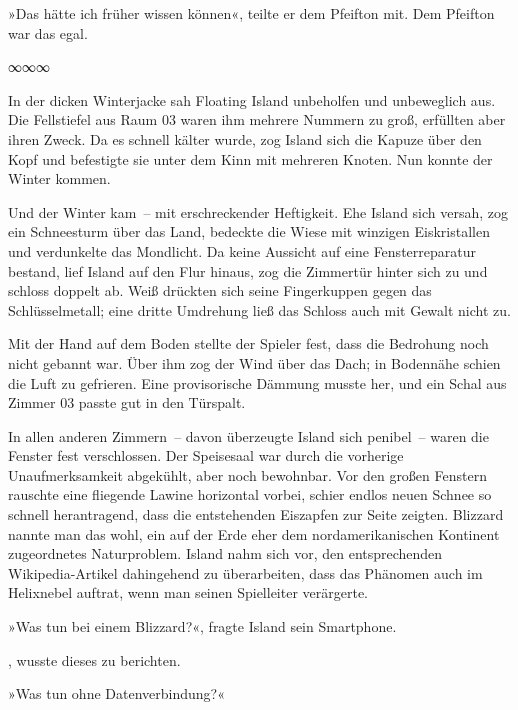 
»Das hätte ich früher wissen können«, teilte er dem Pfeifton mit. Dem Pfeifton war das egal.

\begin{center}
∞∞∞
\end{center}

In der dicken Winterjacke sah Floating Island unbeholfen und unbeweglich aus. Die Fellstiefel aus Raum 03 waren ihm mehrere Nummern zu groß, erfüllten aber ihren Zweck. Da es schnell kälter wurde, zog Island sich die Kapuze über den Kopf und befestigte sie unter dem Kinn mit mehreren Knoten. Nun konnte der Winter kommen.

Und der Winter kam~– mit erschreckender Heftigkeit. Ehe Island sich versah, zog ein Schneesturm über das Land, bedeckte die Wiese mit winzigen Eiskristallen und verdunkelte das Mondlicht. Da keine Aussicht auf eine Fensterreparatur bestand, lief Island auf den Flur hinaus, zog die Zimmertür hinter sich zu und schloss doppelt ab. Weiß drückten sich seine Fingerkuppen gegen das Schlüsselmetall; eine dritte Umdrehung ließ das Schloss auch mit Gewalt nicht zu.

Mit der Hand auf dem Boden stellte der Spieler fest, dass die Bedrohung noch nicht gebannt war. Über ihm zog der Wind über das Dach; in Bodennähe schien die Luft zu gefrieren. Eine provisorische Dämmung musste her, und ein Schal aus Zimmer 03 passte gut in den Türspalt.

In allen anderen Zimmern~– davon überzeugte Island sich penibel~– waren die Fenster fest verschlossen. Der Speisesaal war durch die vorherige Unaufmerksamkeit abgekühlt, aber noch bewohnbar. Vor den großen Fenstern rauschte eine fliegende Lawine horizontal vorbei, schier endlos neuen Schnee so schnell herantragend, dass die entstehenden Eiszapfen zur Seite zeigten. Blizzard nannte man das wohl, ein auf der Erde eher dem nordamerikanischen Kontinent zugeordnetes Naturproblem. Island nahm sich vor, den entsprechenden Wikipedia-Artikel dahingehend zu überarbeiten, dass das Phänomen auch im Helixnebel auftrat, wenn man seinen Spielleiter verärgerte.

»Was tun bei einem Blizzard?«, fragte Island sein Smartphone.

, wusste dieses zu berichten.

»Was tun ohne Datenverbindung?«


